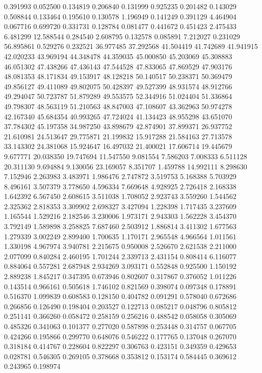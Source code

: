 0.391993
0.052500
0.134819
0.206840
0.131999
0.925235
0.201482
0.143029
0.508844
0.133464
0.195610
0.130578
1.196949
0.141249
0.391129
4.464904
0.067716
0.699720
0.331731
0.128784
0.081477
0.441672
0.451423
2.475433
6.481299
12.588544
0.284540
2.608795
0.132578
0.085891
7.212027
0.231029
56.895861
0.529276
0.232521
36.977485
37.292568
41.504419
41.742689
41.941915
42.020233
43.969194
44.348478
44.359035
45.000850
45.203069
45.308883
46.051302
47.438266
47.436143
47.544528
47.833065
47.869529
47.903176
48.081353
48.171834
49.153917
48.128218
50.140517
50.238371
50.369479
49.856127
49.411089
49.802075
50.428397
49.527399
48.931574
48.912766
49.294047
50.723787
51.879289
49.553575
52.344916
51.024404
51.336864
49.798307
48.563119
51.210563
48.847003
47.108607
43.362963
50.974278
42.167340
45.684354
40.993265
47.724024
41.134423
48.955298
43.651070
37.784302
45.197358
34.987250
43.898679
42.874901
37.899371
26.937752
21.610981
24.513647
29.775871
21.199832
15.917288
21.584163
27.713578
33.143302
24.381068
15.924647
16.497032
21.400021
17.606714
19.445679
9.677771
20.038350
19.747694
11.547550
9.081554
7.586203
7.008333
6.511128
20.311130
9.694884
9.130056
23.169057
8.351707
1.459788
14.992111
8.298630
7.152946
2.263983
3.483971
1.986476
2.747872
3.519753
5.168388
5.703929
8.496161
3.507379
3.778650
4.596334
7.669648
4.928925
2.726418
2.168338
1.642392
6.567450
2.608615
3.511038
1.708052
2.923743
3.559260
1.544562
2.325362
2.818353
3.309902
2.698327
3.427094
1.228398
1.717435
3.237609
1.165544
1.529216
2.182546
3.230006
1.973171
2.943303
1.562228
3.454370
3.792149
1.589898
3.258825
7.687460
2.503912
1.886814
3.411302
1.677563
1.279339
3.002249
2.899400
1.700635
1.170171
2.965548
4.966564
1.011561
1.330198
4.967974
3.940781
2.215675
0.950008
2.526670
2.621538
2.211000
2.077099
0.840284
2.460195
1.701244
2.339713
2.431154
0.808414
6.116077
0.884064
0.557281
2.687948
2.934269
3.093171
0.552848
0.925500
1.150192
2.889238
1.845217
0.347395
0.673946
0.802607
0.317867
0.376052
1.011226
0.143514
0.966161
0.505618
1.746102
0.821569
0.398074
0.097348
0.178891
0.516370
1.099839
0.608583
0.128150
0.404782
0.091291
0.578040
0.672686
0.266856
0.126490
0.198404
0.203527
0.122713
0.085217
0.048796
0.805812
0.251141
0.366260
0.058472
0.258159
0.256216
0.488542
0.058058
0.305069
0.485326
0.341063
0.101377
0.277020
0.587898
0.253448
0.314757
0.067705
0.424266
0.195866
0.299770
0.648076
0.546222
0.177765
0.137048
0.267070
0.318184
0.414767
0.228604
0.822297
0.306763
0.423151
0.349359
0.429653
0.028781
0.546305
0.269105
0.378668
0.353812
0.153174
0.584445
0.369612
0.243965
0.198974

